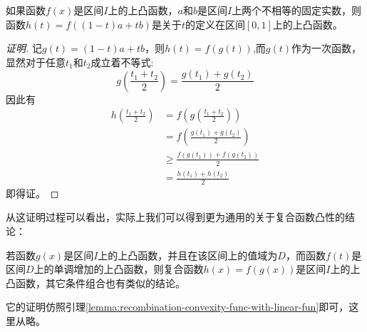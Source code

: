 \begin{lemma}
  \label{lemma:recombination-convexity-func-with-linear-fun}
如果函数$f(x)$是区间$I$上的上凸函数，$a$和$b$是区间$I$上两个不相等的固定实数，则函数$h(t)=f((1-t)a+tb)$是关于$t$的定义在区间$[0,1]$上的上凸函数。
\end{lemma}
\begin{proof}[证明]
 记$g(t)=(1-t)a+tb$，则$h(t)=f(g(t))$,而$g(t)$作为一次函数，显然对于任意$t_1$和$t_2$成立着不等式:
\[ g \left( \frac{t_1+t_2}{2} \right)=\frac{g(t_1)+g(t_2)}{2} \] 
因此有
\begin{align*}
  h \left( \frac{t_1+t_2}{2} \right) &= f \left( g\left( \frac{t_1+t_2}{2} \right) \right) \\
& = f \left( \frac{g(t_1)+g(t_2)}{2} \right) \\
& \geqslant \frac{f(g(t_1))+f(g(t_2))}{2} \\
& = \frac{h(t_1)+h(t_2)}{2}
\end{align*}
即得证。
\end{proof}

从这证明过程可以看出，实际上我们可以得到更为通用的关于复合函数凸性的结论：
\begin{theorem}
  若函数$g(x)$是区间$I$上的上凸函数，并且在该区间上的值域为$D$，而函数$f(t)$是区间$D$上的单调增加的上凸函数，则复合函数$h(x)=f(g(x))$是区间$I$上的上凸函数，其它条件组合也有类似的结论。
\end{theorem}
它的证明仿照引理\ref{lemma:recombination-convexity-func-with-linear-fun}即可，这里从略。

